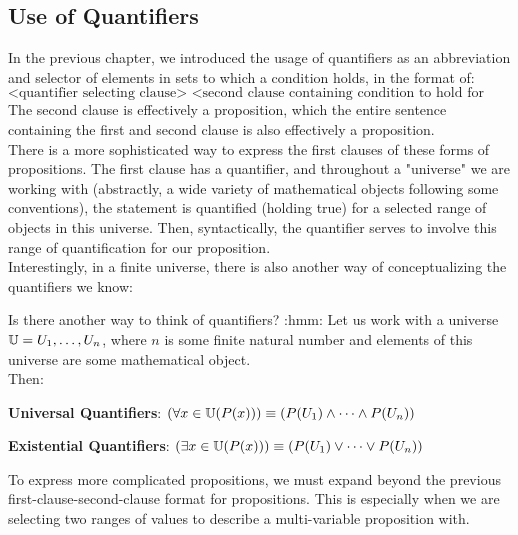 \subsection{Use of Quantifiers}
In the previous chapter, we introduced the usage of quantifiers as an abbreviation and selector of elements in sets to which a condition holds, in the format of:
\[\text{<quantifier selecting clause> <second clause containing condition to hold for selected values>}\]
The second clause is effectively a proposition, which the entire sentence containing the first and second clause is also effectively a proposition. \\
There is a more sophisticated way to express the first clauses of these forms of propositions. The first clause has a quantifier, and throughout a "universe" we are working with (abstractly, a wide variety of mathematical objects following some conventions), the statement is quantified (holding true) for a selected range of objects in this universe. Then, syntactically, the quantifier serves to involve this range of quantification for our proposition. \\
Interestingly, in a finite universe, there is also another way of conceptualizing the quantifiers we know:
\begin{ln-think}{Is there another way to think of quantifiers? :hmm:}{}
    Let us work with a universe $\mathbb{U} = {U_1, \dots, U_n}$, where $n$ is some finite natural number and elements of this universe are some mathematical object. \\
    Then:
    \begin{bindenum}
        \item \textbf{Universal Quantifiers}: $(\forall x \in \mathbb{U} (P(x))) \equiv (P(U_1) \land \dots \land P(U_n))$
        \item \textbf{Existential Quantifiers}: $(\exists x \in \mathbb{U} (P(x))) \equiv (P(U_1) \lor \dots \lor P(U_n))$
    \end{bindenum}
\end{ln-think}
To express more complicated propositions, we must expand beyond the previous first-clause-second-clause format for propositions. This is especially when we are selecting two ranges of values to describe a multi-variable proposition with.
